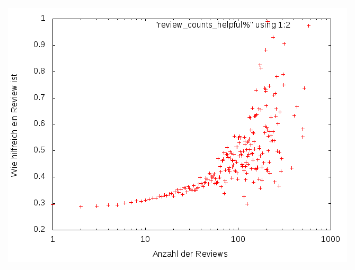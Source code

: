 \documentclass{scrartcl}
\theoremstyle{my_th_style}
\begin{document}
\begin{figure}[H]
   \includegraphics[width=0.8\textwidth]{_results/helpfull_count2.png}
\end{figure}

\newpage
\end{document}
